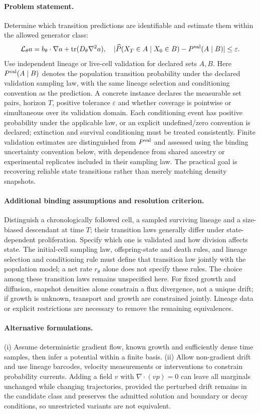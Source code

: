\documentclass[11pt]{article}
\begin{document}
\paragraph{Problem statement.} Determine which transition predictions are identifiable and estimate them within the allowed generator class:
\[
\mathcal L_\theta a=b_\theta\cdot\nabla a+\operatorname{tr}(D_\theta\nabla^2a),
\quad |\widehat P(X_T\in A\mid X_0\in B)-P^{\rm val}(A\mid B)|\leq\varepsilon.
\]
Use independent lineage or live-cell validation for declared sets $A,B$. Here $P^{\rm val}(A\mid B)$ denotes the population transition probability under the declared validation sampling law, with the same lineage selection and conditioning convention as the prediction. A concrete instance declares the measurable set pairs, horizon $T$, positive tolerance $\varepsilon$ and whether coverage is pointwise or simultaneous over its validation domain. Each conditioning event has positive probability under the applicable law, or an explicit undefined/zero convention is declared; extinction and survival conditioning must be treated consistently. Finite validation estimates are distinguished from $P^{\rm val}$ and assessed using the binding uncertainty convention below, with dependence from shared ancestry or experimental replicates included in their sampling law. The practical goal is recovering reliable state transitions rather than merely matching density snapshots.
\paragraph{Additional binding assumptions and resolution criterion.} Distinguish a chronologically followed cell, a sampled surviving lineage and a size-biased descendant at time $T$; their transition laws generally differ under state-dependent proliferation. Specify which one is validated and how division affects state. The initial-cell sampling law, offspring-state and death rules, and lineage selection and conditioning rule must define that transition law jointly with the population model; a net rate $r_\theta$ alone does not specify these rules. The choice among these transition laws remains unspecified here. For fixed growth and diffusion, snapshot densities alone constrain a flux divergence, not a unique drift; if growth is unknown, transport and growth are constrained jointly. Lineage data or explicit restrictions are necessary to remove the remaining equivalences.

\paragraph{Alternative formulations.} (i) Assume deterministic gradient flow, known growth and sufficiently dense time samples, then infer a potential within a finite basis. (ii) Allow non-gradient drift and use lineage barcodes, velocity measurements or interventions to constrain probability currents. Adding a field $v$ with $\nabla\cdot(vp)=0$ can leave all marginals unchanged while changing trajectories, provided the perturbed drift remains in the candidate class and preserves the admitted solution and boundary or decay conditions, so unrestricted variants are not equivalent.
\end{document}
